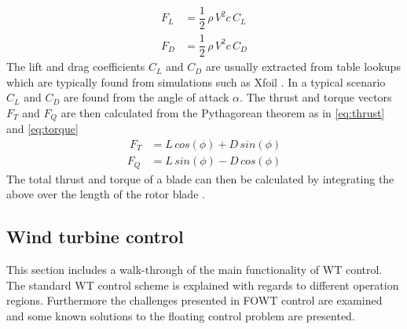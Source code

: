 \begin{align}
	F_L &= \dfrac{1}{2}\,  \rho \, V^2 c \, C_L \label{eq:lift}\\
	F_D &= \dfrac{1}{2} \, \rho \, V^2 c \, C_D \label{eq:drag}
\end{align}
The lift and drag coefficients $ C_L $ and $ C_D $ are usually extracted from table lookups which are typically found from simulations such as Xfoil
. 
In a typical scenario $ C_L $ and $ C_D $ are found from the angle of attack $ \alpha $. The thrust and torque vectors $ F_T $ and $ F_Q $ are then calculated from the Pythagorean theorem as in \cref{eq:thrust} and \cref{eq:torque}
\begin{align}\
	F_T &= L \, cos(\phi) + D \, sin(\phi) \label{eq:thrust} \\
	F_Q &= L \, sin(\phi) - D \, cos(\phi) \label{eq:torque}
\end{align}
The total thrust and torque of a blade can then be calculated by integrating the above over the length of the rotor blade \cite{Knudsen2013}.


\subsection{Wind turbine control} \label{sec:theory_ctrl}
This section includes a walk-through of the main functionality of WT control. The standard WT control scheme is explained with regards to different operation regions. Furthermore the challenges presented in FOWT control are examined and some known solutions to the floating control problem are presented. 

